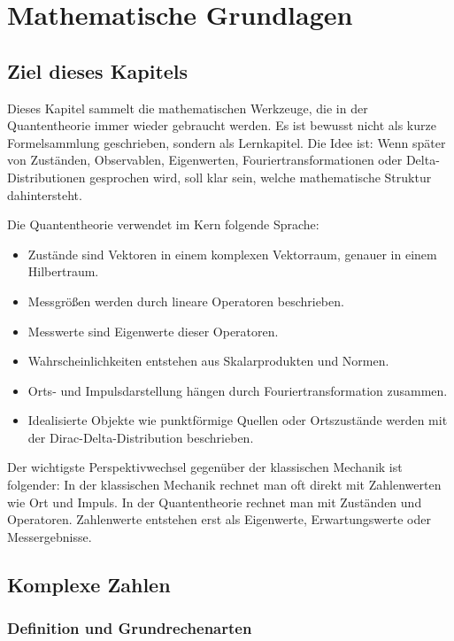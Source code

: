 \chapter{Mathematische Grundlagen}

\section{Ziel dieses Kapitels}

Dieses Kapitel sammelt die mathematischen Werkzeuge, die in der Quantentheorie immer wieder gebraucht werden. Es ist bewusst nicht als kurze Formelsammlung geschrieben, sondern als Lernkapitel. Die Idee ist: Wenn später von Zuständen, Observablen, Eigenwerten, Fouriertransformationen oder Delta-Distributionen gesprochen wird, soll klar sein, welche mathematische Struktur dahintersteht.

Die Quantentheorie verwendet im Kern folgende Sprache:
\begin{itemize}
    \item Zustände sind Vektoren in einem komplexen Vektorraum, genauer in einem Hilbertraum.
    \item Messgrößen werden durch lineare Operatoren beschrieben.
    \item Messwerte sind Eigenwerte dieser Operatoren.
    \item Wahrscheinlichkeiten entstehen aus Skalarprodukten und Normen.
    \item Orts- und Impulsdarstellung hängen durch Fouriertransformation zusammen.
    \item Idealisierte Objekte wie punktförmige Quellen oder Ortszustände werden mit der Dirac-Delta-Distribution beschrieben.
\end{itemize}

\begin{conceptbox}
Der wichtigste Perspektivwechsel gegenüber der klassischen Mechanik ist folgender: In der klassischen Mechanik rechnet man oft direkt mit Zahlenwerten wie Ort und Impuls. In der Quantentheorie rechnet man mit Zuständen und Operatoren. Zahlenwerte entstehen erst als Eigenwerte, Erwartungswerte oder Messergebnisse.
\end{conceptbox}

\section{Komplexe Zahlen}

\subsection{Definition und Grundrechenarten}

